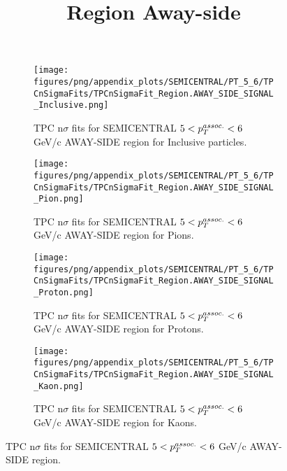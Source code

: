             \begin{figure}[H]
                \title{Region Away-side}
                \begin{subfigure}[b]{0.5\textwidth}
                    \centering
                    \texttt{[image: figures/png/appendix\_plots/SEMICENTRAL/PT\_5\_6/TPCnSigmaFits/TPCnSigmaFit\_Region.AWAY\_SIDE\_SIGNAL\_Inclusive.png]}
                    \caption{TPC n$\sigma$ fits for SEMICENTRAL $5 < \pTassoc < 6$ GeV/c AWAY-SIDE region for Inclusive particles.}
                    \label{fig:appendix_SEMICENTRAL_$5 < \pTassoc < 6$ GeV/c_AWAY_SIDE_SIGNAL_Inclusive}
                \end{subfigure}
                \begin{subfigure}[b]{0.5\textwidth}
                    \centering
                    \texttt{[image: figures/png/appendix\_plots/SEMICENTRAL/PT\_5\_6/TPCnSigmaFits/TPCnSigmaFit\_Region.AWAY\_SIDE\_SIGNAL\_Pion.png]}
                    \caption{TPC n$\sigma$ fits for SEMICENTRAL $5 < \pTassoc < 6$ GeV/c AWAY-SIDE region for Pions.}
                    \label{fig:appendix_SEMICENTRAL_$5 < \pTassoc < 6$ GeV/c_AWAY_SIDE_SIGNAL_Pion}
                \end{subfigure}
                \begin{subfigure}[b]{0.5\textwidth}
                    \centering
                    \texttt{[image: figures/png/appendix\_plots/SEMICENTRAL/PT\_5\_6/TPCnSigmaFits/TPCnSigmaFit\_Region.AWAY\_SIDE\_SIGNAL\_Proton.png]}
                    \caption{TPC n$\sigma$ fits for SEMICENTRAL $5 < \pTassoc < 6$ GeV/c AWAY-SIDE region for Protons.}
                    \label{fig:appendix_SEMICENTRAL_$5 < \pTassoc < 6$ GeV/c_AWAY_SIDE_SIGNAL_Proton}
                \end{subfigure}
                \begin{subfigure}[b]{0.5\textwidth}
                    \centering
                    \texttt{[image: figures/png/appendix\_plots/SEMICENTRAL/PT\_5\_6/TPCnSigmaFits/TPCnSigmaFit\_Region.AWAY\_SIDE\_SIGNAL\_Kaon.png]}
                    \caption{TPC n$\sigma$ fits for SEMICENTRAL $5 < \pTassoc < 6$ GeV/c AWAY-SIDE region for Kaons.}
                    \label{fig:appendix_SEMICENTRAL_$5 < \pTassoc < 6$ GeV/c_AWAY_SIDE_SIGNAL_Kaon}
                \end{subfigure}
                \caption{TPC n$\sigma$ fits for SEMICENTRAL $5 < \pTassoc < 6$ GeV/c AWAY-SIDE region.}
                \label{fig:appendix_SEMICENTRAL_$5 < \pTassoc < 6$ GeV/c_AWAY_SIDE_SIGNAL}
            \end{figure}
